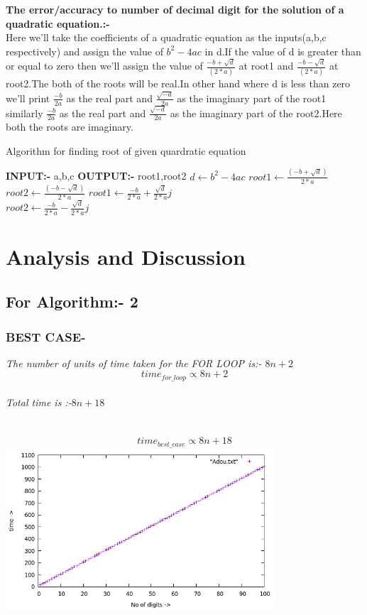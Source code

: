 \documentclass[conference]{IEEEtran}
\begin{document}
\textbf{The error/accuracy to number of decimal digit for the solution of a quadratic equation.:-}\\
Here we’ll take the coefficients of a quadratic equation as the inputs(a,b,c respectively) and assign the value of $b^2 - 4ac$ in d.If the value of d is greater than or equal to zero then we’ll assign the value of $\frac{-b + \sqrt{d}}{(2*a)}$ at root1 and  $\frac{-b - \sqrt{d}}{(2*a)}$ at root2.The both of the roots will be real.In other hand where d is less than zero we’ll print $\frac{-b}{2a}$ as the real part and  $\frac{\sqrt{-d}}{2a}$ as the imaginary part of the root1 similarly $\frac{-b}{2a}$ as the real part and $\frac{\sqrt{-d}}{2a}$ as the imaginary part of the root2.Here both the roots are imaginary.
\begin{algorithm}[H]
\begin{algorithmic}
\caption{Algorithm for finding root of given quardratic equation}
\State \textbf{INPUT:-} a,b,c
\State \textbf{OUTPUT:-} root1,root2
\State $d \gets b^2-4ac$
    \State $root1 \gets \frac{(-b+\sqrt{d})}{2*a}$
    \State $root2 \gets \frac{(-b-\sqrt{d})}{2*a}$
\Else
    \State $root1 \gets \frac{-b}{2*a} + \frac{\sqrt{d}}{2*a}j$\\
    \State $root2 \gets \frac{-b}{2*a} - \frac{\sqrt{d}}{2*a}j$
\EndIf
\end{algorithmic}
\end{algorithm}
\section{Analysis and Discussion}
\subsection{For Algorithm:- 2}
\subsubsection{\textbf{BEST CASE-}}
\textit{The number of units of time taken for the FOR LOOP is:- $8n+2$
\\ $$time_{for\_loop} \propto 8n+2$$
\\ Total time is :-$8n+18$
\\\\\ $$time_{best\_case} \propto 8n+18$$}
 \includegraphics[height =  6.00cm,width = \linewidth]{bestcase_png.png}
\end{document}
